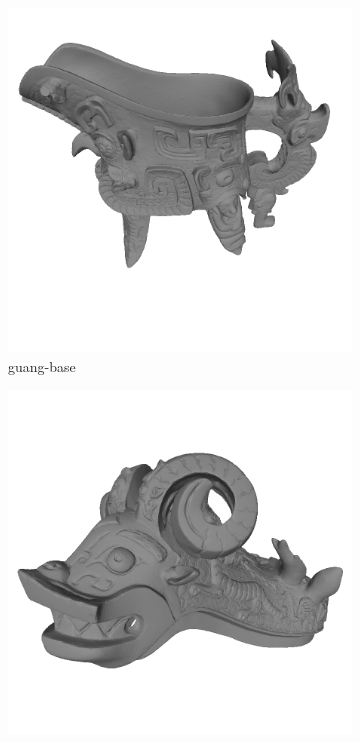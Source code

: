 \begin{figure}
	\begin{subfigure}[b]{0.23\linewidth}
	\includegraphics[width=\linewidth]{./Figures/train-dataset/48.guang-base.png}
	\caption{guang-base}
\end{subfigure}
\begin{subfigure}[b]{0.23\linewidth}
	\includegraphics[width=\linewidth]{./Figures/train-dataset/49.guang-lid.png}

\end{subfigure}
\end{figure}
